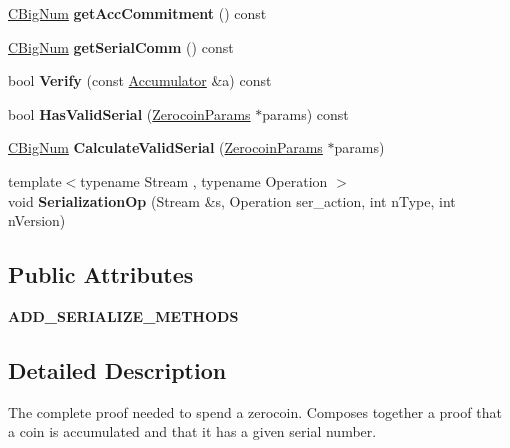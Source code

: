 \begin{DoxyCompactItemize}
\mbox{\hyperlink{class_c_big_num}{C\+Big\+Num}} {\bfseries get\+Acc\+Commitment} () const
\item 
\mbox{\label{classlibzerocoin_1_1_coin_spend_a1c8a4c89acab5b530f728c4a57389c6f}} 
\mbox{\hyperlink{class_c_big_num}{C\+Big\+Num}} {\bfseries get\+Serial\+Comm} () const
\item 
\mbox{\label{classlibzerocoin_1_1_coin_spend_ad8005b899d45939c63ccaba43011c85b}} 
bool {\bfseries Verify} (const \mbox{\hyperlink{classlibzerocoin_1_1_accumulator}{Accumulator}} \&a) const
\item 
\mbox{\label{classlibzerocoin_1_1_coin_spend_a64eae09a4ab03e01e46f7a967f0ab1b9}} 
bool {\bfseries Has\+Valid\+Serial} (\mbox{\hyperlink{classlibzerocoin_1_1_zerocoin_params}{Zerocoin\+Params}} $\ast$params) const
\item 
\mbox{\label{classlibzerocoin_1_1_coin_spend_a9d3f9990bf4a44242f392fbda37503f5}} 
\mbox{\hyperlink{class_c_big_num}{C\+Big\+Num}} {\bfseries Calculate\+Valid\+Serial} (\mbox{\hyperlink{classlibzerocoin_1_1_zerocoin_params}{Zerocoin\+Params}} $\ast$params)
\item 
\mbox{\label{classlibzerocoin_1_1_coin_spend_a1e805030691223c64506a3c5558423d0}} 
{\footnotesize template$<$typename Stream , typename Operation $>$ }\\void {\bfseries Serialization\+Op} (Stream \&s, Operation ser\+\_\+action, int n\+Type, int n\+Version)
\end{DoxyCompactItemize}
\subsection*{Public Attributes}
\begin{DoxyCompactItemize}
\item 
\mbox{\label{classlibzerocoin_1_1_coin_spend_aee9039ba19056a64591ba4c6f9720290}} 
{\bfseries A\+D\+D\+\_\+\+S\+E\+R\+I\+A\+L\+I\+Z\+E\+\_\+\+M\+E\+T\+H\+O\+DS}
\end{DoxyCompactItemize}


\subsection{Detailed Description}
The complete proof needed to spend a zerocoin. Composes together a proof that a coin is accumulated and that it has a given serial number. 

